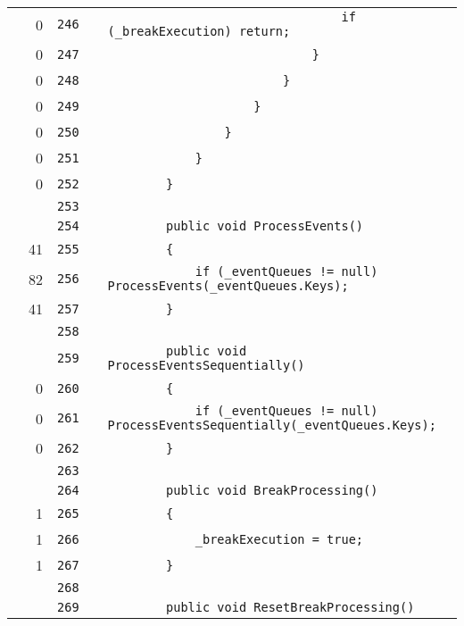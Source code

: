 \documentclass[a4paper,landscape,10pt]{article}
\begin{document}
\begin{longtable}[l]{lrrll}
\cellcolor{red} & 0 & \verb~246~ & & \verb~                                if (_breakExecution) return;~\\
\cellcolor{red} & 0 & \verb~247~ & & \verb~                            }~\\
\cellcolor{red} & 0 & \verb~248~ & & \verb~                        }~\\
\cellcolor{red} & 0 & \verb~249~ & & \verb~                    }~\\
\cellcolor{red} & 0 & \verb~250~ & & \verb~                }~\\
\cellcolor{red} & 0 & \verb~251~ & & \verb~            }~\\
\cellcolor{red} & 0 & \verb~252~ & & \verb~        }~\\
\cellcolor{gray} &  & \verb~253~ & & \verb~~\\
\cellcolor{gray} &  & \verb~254~ & & \verb~        public void ProcessEvents()~\\
\cellcolor{green} & 41 & \verb~255~ & & \verb~        {~\\
\cellcolor{green} & 82 & \verb~256~ & & \verb~            if (_eventQueues != null) ProcessEvents(_eventQueues.Keys);~\\
\cellcolor{green} & 41 & \verb~257~ & & \verb~        }~\\
\cellcolor{gray} &  & \verb~258~ & & \verb~~\\
\cellcolor{gray} &  & \verb~259~ & & \verb~        public void ProcessEventsSequentially()~\\
\cellcolor{red} & 0 & \verb~260~ & & \verb~        {~\\
\cellcolor{red} & 0 & \verb~261~ & & \verb~            if (_eventQueues != null) ProcessEventsSequentially(_eventQueues.Keys);~\\
\cellcolor{red} & 0 & \verb~262~ & & \verb~        }~\\
\cellcolor{gray} &  & \verb~263~ & & \verb~~\\
\cellcolor{gray} &  & \verb~264~ & & \verb~        public void BreakProcessing()~\\
\cellcolor{green} & 1 & \verb~265~ & & \verb~        {~\\
\cellcolor{green} & 1 & \verb~266~ & & \verb~            _breakExecution = true;~\\
\cellcolor{green} & 1 & \verb~267~ & & \verb~        }~\\
\cellcolor{gray} &  & \verb~268~ & & \verb~~\\
\cellcolor{gray} &  & \verb~269~ & & \verb~        public void ResetBreakProcessing()~\\

\end{longtable}
\end{document}
